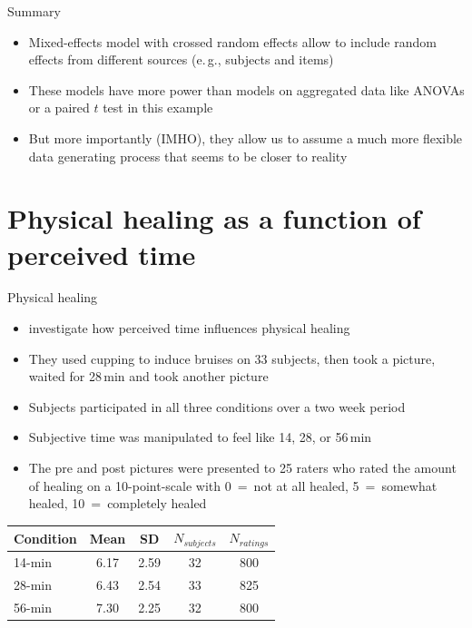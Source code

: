 \documentclass[aspectratio=169]{beamer}
\begin{document}
\begin{frame}{Summary}
  \begin{itemize}
    \item Mixed-effects model with crossed random effects allow to include
      random effects from different sources (e.\,g., subjects and items)
    \item These models have more power than models on aggregated data like
      ANOVAs or a paired $t$ test in this example \citep[see
      e.\,g.,][]{Jaeger2008}
    \item But more importantly (IMHO), they allow us to assume a much more
      flexible data generating process that seems to be closer to reality
  \end{itemize}
  \vfill
\end{frame}

\section[Physical healing]{Physical healing as a function of perceived time}

\begin{frame}{Physical healing \citep{Aungle2023}}
  \begin{itemize}
    \item \citet{Aungle2023} investigate how perceived time influences physical
      healing
    \item They used cupping to induce bruises on 33 subjects, then took a
      picture, waited for 28\,min and took another picture
    \item Subjects participated in all three conditions over a two week period
    \item Subjective time was manipulated to feel like 14, 28, or 56\,min
    \item The pre and post pictures were presented to 25 raters who rated the
      amount of healing on a 10-point-scale with 0~=~not at all healed,
      5~=~somewhat healed, 10~=~completely healed
  \end{itemize}
  \begin{center}
  \begin{tabular}{l|cccc}
    \hline
    Condition & Mean  & SD    & $N_{subjects}$ & $N_{ratings}$ \\
    \hline
    14-min    & 6.17  & 2.59  & 32             &  800 \\
    28-min    & 6.43  & 2.54  & 33             &  825 \\
    56-min    & 7.30  & 2.25  & 32             &  800 \\
    \hline
  \end{tabular}
  \end{center}
\end{frame}
\end{document}
